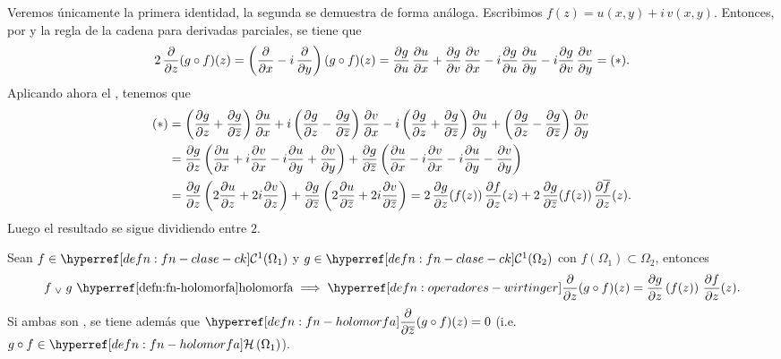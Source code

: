 \begin{dem}
    Veremos únicamente la primera identidad, la segunda se demuestra de forma análoga. Escribimos $f(z) = u(x, y) + i \, v(x, y)$. Entonces, por  y la regla de la cadena para derivadas parciales, se tiene que
    \[
    \begin{aligned}
        2\, \pdv{}{z} (g \circ f)(z) &= \left(\pdv{}{x} - i \, \pdv{}{y}\right) (g \circ f)(z) = \pdv{g}{u} \, \pdv{u}{x} + \pdv{g}{v} \, \pdv{v}{x} - i \pdv{g}{u} \, \pdv{u}{y} - i \pdv{g}{v} \, \pdv{v}{y} = (\ast). \\
    \end{aligned}
    \]
    Aplicando ahora el , tenemos que
    \[
    \begin{aligned}
        (\ast) &= \left(\pdv{g}{z} + \pdv{g}{\overline{z}}\right) \pdv{u}{x} + i\left(\pdv{g}{z} - \pdv{g}{\overline{z}}\right) \pdv{v}{x} - i \left(\pdv{g}{z} + \pdv{g}{\overline{z}}\right) \pdv{u}{y} + \left(\pdv{g}{z} - \pdv{g}{\overline{z}}\right) \pdv{v}{y} \\
        &= \pdv{g}{z}\left(\pdv{u}{x} + i \pdv{v}{x} - i\pdv{u}{y} + \pdv{v}{y}\right) + \pdv{g}{\overline{z}}\left(\pdv{u}{x} - i \pdv{v}{x} - i\pdv{u}{y} - \pdv{v}{y}\right) \\
        &= \pdv{g}{z} \left(2 \pdv{u}{z} + 2 i \pdv{v}{z}\right) + \pdv{g}{\overline{z}} \left(2 \pdv{u}{\overline{z}} + 2 i \pdv{v}{\overline{z}}\right) = 2 \, \pdv{g}{z}(f(z)) \, \pdv{f}{z}(z) + 2 \, \pdv{g}{\overline{z}}(f(z)) \, \pdv{\overline{f}}{z}(z).
    \end{aligned}
    \]
    Luego el resultado se sigue dividiendo entre $2$.
\end{dem}

\begin{cor}\label{cor:wirtinger-composicion-holomorfas}
    Sean $f \in \exhyperref[defn:fn-clase-ck]{fn-clase-ck}{\mathcal{C}^1}(\Omega_1)$ y $g \in \exhyperref[defn:fn-clase-ck]{fn-clase-ck}{\mathcal{C}^1}(\Omega_2)$ con $f(\Omega_1) \subset \Omega_2$, entonces
    \[
    f \ve g \tex{ \exhyperref[defn:fn-holomorfa]{fn-holomorfa}{holomorfa}} \implies \exhyperref[defn:operadores-wirtinger]{operadores-wirtinger}{\pdv{}{z}} (g \circ f)(z) = \pdv{g}{z}\left(f(z)\right) \, \pdv{f}{z}(z).
    \]
    Si ambas son , se tiene además que $\ds \exhyperref[defn:fn-holomorfa]{fn-holomorfa}{\pdv{}{\bar{z}}} (g \circ f)(z) = 0$ (i.e. $g \circ f \in \exhyperref[defn:fn-holomorfa]{fn-holomorfa}{\mathcal{H}}\left(\Omega_1\right)$).
\end{cor}

